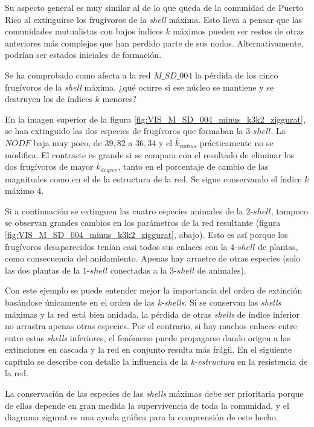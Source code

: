 Su aspecto general es muy similar al de lo que queda de la comunidad de Puerto Rico al extinguirse los frugívoros de la \textit{shell} máxima. Esto lleva a pensar que las comunidades mutualistas con bajos índices $k$ máximos pueden ser restos de otras anteriores más complejas que han perdido parte de sus nodos. Alternativamente, podrían ser estados iniciales de formación.

Se ha comprobado como afecta a la red $M\_SD\_004$ la pérdida de los cinco frugívoros de la \textit{shell} máxima, ¿qué ocurre si ese núcleo se mantiene y se destruyen los de índices $k$ menores?

En la imagen superior de la figura \ref{fig:VIS_M_SD_004_minus_k3k2_ziggurat}, se han extinguido las dos especies de frugívoros que formaban la $3$-$shell$. La $NODF$ baja muy poco, de $39,82$ a $36,34$ y el $\overline k_{radius}$ prácticamente no se modifica. El contraste es grande si se compara con el resultado de eliminar los dos frugívoros de mayor $\overline k_{degree}$, tanto en el porcentaje de cambio de las magnitudes como en el de la estructura de la red. Se sigue conservando el índice $k$ máximo $4$.

Si a continuación se extinguen las cuatro especies animales de la $2$-$shell$, tampoco se observan grandes cambios en los parámetros de la red resultante (figura \ref{fig:VIS_M_SD_004_minus_k3k2_ziggurat}, abajo). Esto es así porque los frugívoros desaparecidos tenían casi todos sus enlaces con la $4$-$shell$ de plantas, como consecuencia del anidamiento. Apenas hay arrastre de otras especies (solo las dos plantas de la $1$-$shell$ conectadas a la $3$-$shell$ de animales).

Con este ejemplo se puede entender mejor la importancia del orden de extinción basándose únicamente en el orden de las \textit{k-shells}. Si se conservan las \textit{shells} máximas y la red está bien anidada, la pérdida de otras \textit{shells} de índice inferior no arrastra apenas otras especies. Por el contrario, si hay muchos enlaces entre entre estas \textit{shells} inferiores, el fenómeno puede propagarse dando origen a las extinciones en cascada y la red en conjunto resulta más frágil. En el siguiente capítulo se describe con detalle la influencia de la \textit{k-estructura} en la resistencia de la red.

La conservación de las especies de las \textit{shells} máximas debe ser prioritaria porque de ellas depende en gran medida la supervivencia de toda la comunidad, y el diagrama zigurat es una ayuda gráfica para la comprensión de este hecho.

